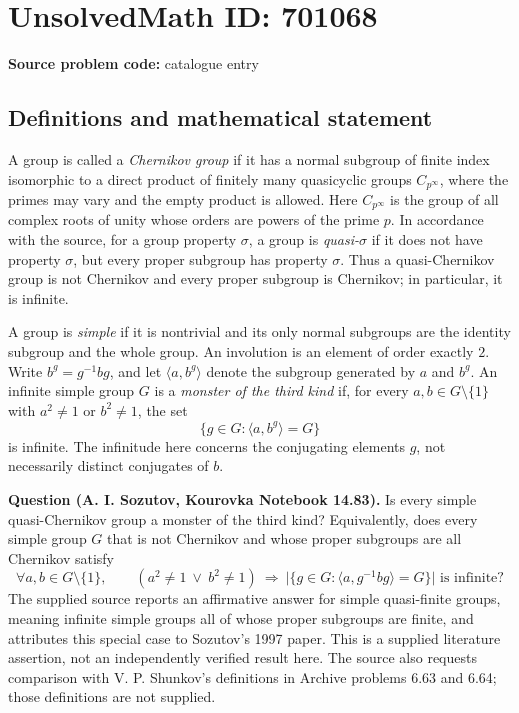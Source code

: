 \documentclass[11pt]{article}
\begin{document}
\section*{UnsolvedMath ID: 701068}
\textbf{Source problem code:} catalogue entry
\subsection{Definitions and mathematical statement}
A group is called a \emph{Chernikov group} if it has a normal subgroup of finite index isomorphic to a direct product of finitely many quasicyclic groups \(C_{p^\infty}\), where the primes may vary and the empty product is allowed. Here \(C_{p^\infty}\) is the group of all complex roots of unity whose orders are powers of the prime \(p\). In accordance with the source, for a group property \(\sigma\), a group is \emph{quasi-\(\sigma\)} if it does not have property \(\sigma\), but every proper subgroup has property \(\sigma\). Thus a quasi-Chernikov group is not Chernikov and every proper subgroup is Chernikov; in particular, it is infinite.

A group is \emph{simple} if it is nontrivial and its only normal subgroups are the identity subgroup and the whole group. An involution is an element of order exactly \(2\). Write \(b^g=g^{-1}bg\), and let \(\langle a,b^g\rangle\) denote the subgroup generated by \(a\) and \(b^g\). An infinite simple group \(G\) is a \emph{monster of the third kind} if, for every \(a,b\in G\setminus\{1\}\) with \(a^2\ne1\) or \(b^2\ne1\), the set
\[
\{g\in G:\langle a,b^g\rangle=G\}
\]
is infinite. The infinitude here concerns the conjugating elements \(g\), not necessarily distinct conjugates of \(b\).

\textbf{Question (A. I. Sozutov, Kourovka Notebook 14.83).} Is every simple quasi-Chernikov group a monster of the third kind? Equivalently, does every simple group \(G\) that is not Chernikov and whose proper subgroups are all Chernikov satisfy
\[
\forall a,b\in G\setminus\{1\},\qquad
(a^2\ne1\ \lor\ b^2\ne1)
\ \Longrightarrow\
\bigl|\{g\in G:\langle a,g^{-1}bg\rangle=G\}\bigr|\text{ is infinite}?
\]
The supplied source reports an affirmative answer for simple quasi-finite groups, meaning infinite simple groups all of whose proper subgroups are finite, and attributes this special case to Sozutov's 1997 paper. This is a supplied literature assertion, not an independently verified result here. The source also requests comparison with V. P. Shunkov's definitions in Archive problems 6.63 and 6.64; those definitions are not supplied.
\end{document}
